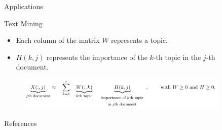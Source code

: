 \documentclass[final]{beamer}
\newlength{\sepwid}
\newlength{\onecolwid}
\newlength{\threecolwid}
\begin{document}
\begin{frame}
\begin{columns}[t]
\begin{column}{\threecolwid}
\begin{exampleblock}{Applications}
\begin{block}{Text Mining}
\begin{itemize}
    \item Each column of the matrix $W$ represents a topic.
    \item $H(k, j)$ represents the importance of the $k$-th topic in the $j$-th document.
\end{itemize}
\begin{figure}
    \centering
    \includegraphics{../images/NMF_app2.png}
\end{figure}
\end{block}
\end{exampleblock}
\begin{exampleblock}{References}
\nocite{NMF}
\nocite{biclique}
\printbibliography
\end{exampleblock}
\end{column}
\begin{column}{\sepwid}
\end{column} %
\begin{column}{\onecolwid} %



\end{column}
\end{columns}
\end{frame}
\end{document}
